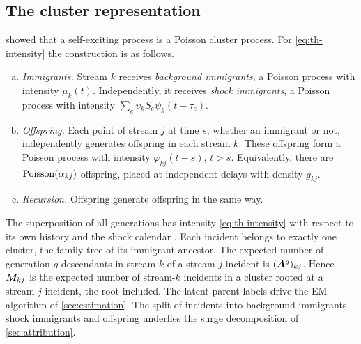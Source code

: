 \subsection{The cluster representation}\label{sec:th-cluster}

 showed that a self-exciting process is a Poisson cluster process.
For \eqref{eq:th-intensity} the construction is as follows.
\begin{enumerate}[(a)]
  \item \emph{Immigrants.} Stream $k$ receives \emph{background immigrants}, a Poisson
    process with intensity $\mu_k(t)$. Independently, it receives \emph{shock
    immigrants}, a Poisson process with intensity
    $\sum_e\upsilon_kS_e\psi_k(t-\tau_e)$.
  \item \emph{Offspring.} Each point of stream $j$ at time $s$, whether an immigrant or
    not, independently generates offspring in each stream $k$. These offspring form a
    Poisson process with intensity $\varphi_{kj}(t-s)$, $t>s$. Equivalently, there are
    $\operatorname{Poisson}(\alpha_{kj})$ offspring, placed at independent delays with
    density $g_{kj}$.
  \item \emph{Recursion.} Offspring generate offspring in the same way.
\end{enumerate}
The superposition of all generations has intensity \eqref{eq:th-intensity} with respect
to its own history and the shock calendar \citep{hawkes1974,reinhart2018,laub2021}.
Each incident belongs to exactly one cluster, the family tree of its immigrant
ancestor. The expected number of generation-$g$ descendants in stream $k$ of a
stream-$j$ incident is $(\bm{A}^g)_{kj}$. Hence $\bm{M}_{kj}$ is the expected number of
stream-$k$ incidents in a cluster rooted at a stream-$j$ incident, the root included.
The latent parent labels drive the EM algorithm of \cref{sec:estimation}. The split of
incidents into background immigrants, shock immigrants and offspring underlies the
surge decomposition of \cref{sec:attribution}.


